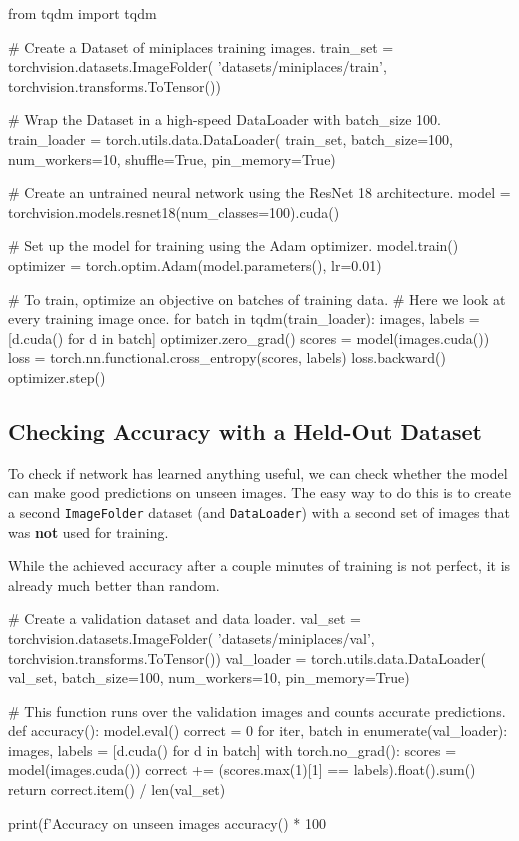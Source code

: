 \begin{codeblock}[language=python]
from tqdm import tqdm

# Create a Dataset of miniplaces training images.
train_set = torchvision.datasets.ImageFolder(
    'datasets/miniplaces/train',
    torchvision.transforms.ToTensor())

# Wrap the Dataset in a high-speed DataLoader with batch_size 100.
train_loader = torch.utils.data.DataLoader(
    train_set, batch_size=100, num_workers=10,
    shuffle=True,
    pin_memory=True)

# Create an untrained neural network using the ResNet 18 architecture.
model = torchvision.models.resnet18(num_classes=100).cuda()

# Set up the model for training using the Adam optimizer.
model.train()
optimizer = torch.optim.Adam(model.parameters(), lr=0.01)

# To train, optimize an objective on batches of training data.
# Here we look at every training image once.
for batch in tqdm(train_loader):
    images, labels = [d.cuda() for d in batch]
    optimizer.zero_grad()
    scores = model(images.cuda())
    loss = torch.nn.functional.cross_entropy(scores, labels)
    loss.backward()
    optimizer.step()
\end{codeblock}

\subsection{Checking Accuracy with a Held-Out Dataset}

To check if network has learned anything useful, we can check whether the model can make good predictions on unseen images. The easy way to do this is to create a second \texttt{ImageFolder} dataset (and \texttt{DataLoader}) with a second set of images that was \textbf{not} used for training. 

While the achieved accuracy after a couple minutes of training is not perfect, it is already much better than random. 

\begin{codeblock}[language=python]
# Create a validation dataset and data loader.
val_set = torchvision.datasets.ImageFolder(
    'datasets/miniplaces/val',
    torchvision.transforms.ToTensor())
val_loader = torch.utils.data.DataLoader(
    val_set, batch_size=100, num_workers=10,
    pin_memory=True)

# This function runs over the validation images and counts accurate predictions.
def accuracy():
    model.eval()
    correct = 0
    for iter, batch in enumerate(val_loader):
        images, labels = [d.cuda() for d in batch]
        with torch.no_grad():
            scores = model(images.cuda())
        correct += (scores.max(1)[1] == labels).float().sum()
    return correct.item() / len(val_set)

print(f'Accuracy on unseen images {accuracy() * 100}%
\end{codeblock}

